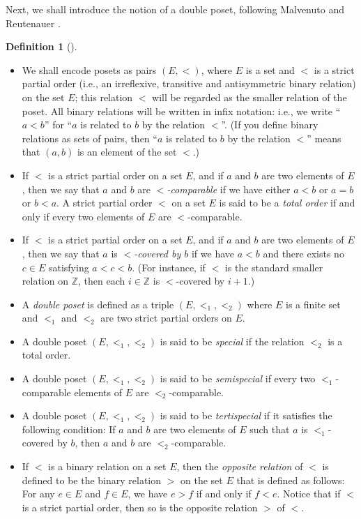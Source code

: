 \documentclass[numbers=enddot,12pt,final,onecolumn,notitlepage,abstracton]{scrartcl}
\theoremstyle{definition}
\newtheorem{defi}[theo]{Definition}
\newenvironment{definition}[1][]
{\begin{defi}[#1]\begin{leftbar}}
{\end{leftbar}\end{defi}}
\newcommand{\ZZ}{{\mathbb{Z}}}
\begin{document}
Next, we shall introduce the notion of a double poset, following
Malvenuto and Reutenauer \cite{Mal-Reu-DP}.

\begin{definition}
\label{def.double-poset}
\begin{itemize}

\item[(a)] We shall encode posets as pairs $\left(E, <\right)$,
where $E$ is a set and $<$ is a strict partial order
(i.e., an irreflexive, transitive and antisymmetric
binary relation) on the set $E$; this relation $<$ will be regarded
as the smaller relation of the poset. All binary relations will be
written in infix notation: i.e., we write ``$a < b$'' for ``$a$ is
related to $b$ by the relation $<$''. (If you define binary relations
as sets of pairs, then ``$a$ is related to $b$ by the relation $<$''
means that $\left(a,b\right)$ is an element of the set $<$.)

\item[(b)] If $<$ is a strict partial order on a set $E$,
and if $a$ and $b$ are two elements of $E$, then we say that
$a$ and $b$ are \textit{$<$-comparable} if we have either $a < b$
or $a = b$ or $b < a$. A strict partial order $<$ on a
set $E$ is said to be a \textit{total order} if and only
if every two elements of $E$ are $<$-comparable.

\item[(c)] If $<$ is a strict partial order on a set $E$,
and if $a$ and $b$ are two elements of $E$, then we say that
$a$ is \textit{$<$-covered by $b$} if we have $a < b$ and there
exists no $c \in E$ satisfying $a < c < b$. (For instance, if $<$
is the standard smaller relation on $\ZZ$, then each
$i \in \ZZ$ is $<$-covered by $i+1$.)

\item[(d)] A \textit{double poset} is defined as a triple
$\left(E, <_1, <_2\right)$ where $E$ is a finite set and $<_1$ and
$<_2$ are two strict partial orders on $E$.

\item[(e)] A double poset
$\left(E, <_1, <_2\right)$ is said to be \textit{special} if
the relation $<_2$ is a total order.

\item[(f)] A double poset
$\left(E, <_1, <_2\right)$ is said to be \textit{semispecial} if
every two $<_1$-comparable elements of $E$ are $<_2$-comparable.

\item[(g)] A double poset
$\left(E, <_1, <_2\right)$ is said to be \textit{tertispecial} if
it satisfies the following condition: If $a$ and $b$ are two
elements of $E$ such that $a$ is $<_1$-covered by $b$, then $a$
and $b$ are $<_2$-comparable.

\item[(h)] If $<$ is a binary relation on a set $E$, then the
\textit{opposite relation} of $<$ is defined to be the binary
relation $>$ on the set $E$ that is defined as follows: For any
$e \in E$ and $f \in E$, we have $e > f$ if and only if $f < e$.
Notice that if $<$ is a strict partial order, then so
is the opposite relation $>$ of $<$.
\end{itemize}
\end{definition}
\end{document}
